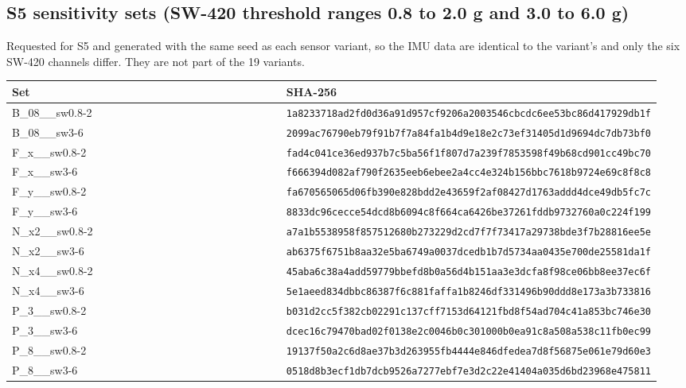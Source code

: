 \subsection*{S5 sensitivity sets (SW-420 threshold ranges 0.8 to 2.0 g and 3.0 to 6.0 g)}

Requested for S5 and generated with the same seed as each sensor variant, so the IMU data are identical to the variant's and only the six SW-420 channels differ. They are not part of the 19 variants.

{\scriptsize\raggedright
\begin{longtable}{p{0.475\linewidth}p{0.475\linewidth}}
\toprule
Set & SHA-256 \\
\midrule
\endhead
B\_08\_\_sw0.8-2 & \texttt{1a8233718ad2fd0d36a91d957cf9206a2003546cbcdc6ee53bc86d417929db1f} \\
B\_08\_\_sw3-6 & \texttt{2099ac76790eb79f91b7f7a84fa1b4d9e18e2c73ef31405d1d9694dc7db73bf0} \\
F\_x\_\_sw0.8-2 & \texttt{fad4c041ce36ed937b7c5ba56f1f807d7a239f7853598f49b68cd901cc49bc70} \\
F\_x\_\_sw3-6 & \texttt{f666394d082af790f2635eeb6ebee2a4cc4e324b156bbc7618b9724e69c8f8c8} \\
F\_y\_\_sw0.8-2 & \texttt{fa670565065d06fb390e828bdd2e43659f2af08427d1763addd4dce49db5fc7c} \\
F\_y\_\_sw3-6 & \texttt{8833dc96cecce54dcd8b6094c8f664ca6426be37261fddb9732760a0c224f199} \\
N\_x2\_\_sw0.8-2 & \texttt{a7a1b5538958f857512680b273229d2cd7f7f73417a29738bde3f7b28816ee5e} \\
N\_x2\_\_sw3-6 & \texttt{ab6375f6751b8aa32e5ba6749a0037dcedb1b7d5734aa0435e700de25581da1f} \\
N\_x4\_\_sw0.8-2 & \texttt{45aba6c38a4add59779bbefd8b0a56d4b151aa3e3dcfa8f98ce06bb8ee37ec6f} \\
N\_x4\_\_sw3-6 & \texttt{5e1aeed834dbbc86387f6c881faffa1b8246df331496b90ddd8e173a3b733816} \\
P\_3\_\_sw0.8-2 & \texttt{b031d2cc5f382cb02291c137cff7153d64121fbd8f54ad704c41a853bc746e30} \\
P\_3\_\_sw3-6 & \texttt{dcec16c79470bad02f0138e2c0046b0c301000b0ea91c8a508a538c11fb0ec99} \\
P\_8\_\_sw0.8-2 & \texttt{19137f50a2c6d8ae37b3d263955fb4444e846dfedea7d8f56875e061e79d60e3} \\
P\_8\_\_sw3-6 & \texttt{0518d8b3ecf1db7dcb9526a7277ebf7e3d2c22e41404a035d6bd23968e475811} \\

\end{longtable}}
